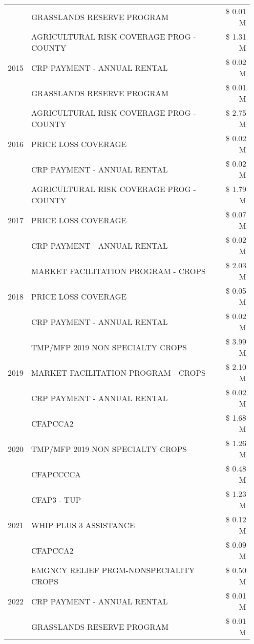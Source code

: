 \begin{tabular}{llr}
 & GRASSLANDS RESERVE PROGRAM & \$ 0.01 M \\
\cline{1-3}
\multirow[t]{3}{*}{2015} & AGRICULTURAL RISK COVERAGE PROG - COUNTY & \$ 1.31 M \\
 & CRP PAYMENT - ANNUAL RENTAL & \$ 0.02 M \\
 & GRASSLANDS RESERVE PROGRAM & \$ 0.01 M \\
\cline{1-3}
\multirow[t]{3}{*}{2016} & AGRICULTURAL RISK COVERAGE PROG - COUNTY & \$ 2.75 M \\
 & PRICE LOSS COVERAGE & \$ 0.02 M \\
 & CRP PAYMENT - ANNUAL RENTAL & \$ 0.02 M \\
\cline{1-3}
\multirow[t]{3}{*}{2017} & AGRICULTURAL RISK COVERAGE PROG - COUNTY & \$ 1.79 M \\
 & PRICE LOSS COVERAGE & \$ 0.07 M \\
 & CRP PAYMENT - ANNUAL RENTAL & \$ 0.02 M \\
\cline{1-3}
\multirow[t]{3}{*}{2018} & MARKET FACILITATION PROGRAM - CROPS & \$ 2.03 M \\
 & PRICE LOSS COVERAGE & \$ 0.05 M \\
 & CRP PAYMENT - ANNUAL RENTAL & \$ 0.02 M \\
\cline{1-3}
\multirow[t]{3}{*}{2019} & TMP/MFP 2019 NON SPECIALTY CROPS & \$ 3.99 M \\
 & MARKET FACILITATION PROGRAM - CROPS & \$ 2.10 M \\
 & CRP PAYMENT - ANNUAL RENTAL & \$ 0.02 M \\
\cline{1-3}
\multirow[t]{3}{*}{2020} & CFAPCCA2 & \$ 1.68 M \\
 & TMP/MFP 2019 NON SPECIALTY CROPS & \$ 1.26 M \\
 & CFAPCCCCA & \$ 0.48 M \\
\cline{1-3}
\multirow[t]{3}{*}{2021} & CFAP3 - TUP & \$ 1.23 M \\
 & WHIP PLUS 3 ASSISTANCE & \$ 0.12 M \\
 & CFAPCCA2 & \$ 0.09 M \\
\cline{1-3}
\multirow[t]{3}{*}{2022} & EMGNCY RELIEF PRGM-NONSPECIALITY CROPS & \$ 0.50 M \\
 & CRP PAYMENT - ANNUAL RENTAL & \$ 0.01 M \\
 & GRASSLANDS RESERVE PROGRAM & \$ 0.01 M \\
\cline{1-3}
\bottomrule
\end{tabular}
